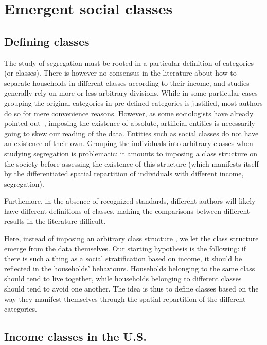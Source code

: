 \section{Emergent social classes}
\label{sec:the_emergent_social_classes}

\subsection{Defining classes}
\label{sub:defining_classes}


The study of segregation must be rooted in a particular definition of categories
(or classes). There is however no consensus in the literature about how to
separate households in different classes according to their income, and studies
generally rely on more or less arbitrary divisions. While in some particular
cases grouping the original categories in pre-defined categories is justified,
most authors do so for mere convenience reasons. However, as some sociologists
have already pointed out~\cite{Emirbayer:1997}, imposing the existence of
absolute, artificial entities is necessarily going to skew our reading of the
data. Entities such as social classes do not have an existence of their own.
Grouping the individuals into arbitrary classes when studying segregation is
problematic: it amounts to imposing a class structure on the society before
assessing the existence of this structure (which manifests itself by the
differentiated spatial repartition of individuals with different income,
segregation). 

Furthemore, in the absence of recognized standards, different authors will
likely have different definitions of classes, making the comparisons between
different results in the literature difficult. 

Here, instead of imposing an arbitrary class structure , we let the class
structure emerge from the data themselves. Our starting hypothesis is the
following: if there is such a thing as a social stratification based on income,
it should be reflected in the households' behaviours. Households belonging to
the same class should tend to live together, while households belonging to
different classes should tend to avoid one another. The idea is thus to define
classes based on the way they manifest themselves through the spatial
repartition of the different categories. 


\subsection{Income classes in the U.S.}
\label{sub:income_classes_in_the_u_s_}

